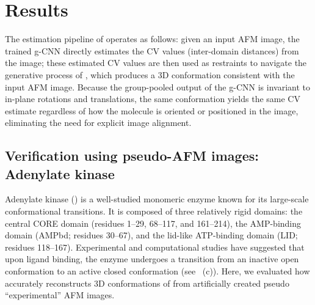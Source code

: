 \section{Results}
\label{sec:results}

The estimation pipeline of \Model operates as follows: given an input AFM image, the trained g-CNN directly estimates the CV values (inter-domain distances) from the image; these estimated CV values are then used as restraints to navigate the generative process of \AFiii, which produces a 3D conformation consistent with the input AFM image.
Because the group-pooled output of the g-CNN is invariant to in-plane rotations and translations, the same conformation yields the same CV estimate regardless of how the molecule is oriented or positioned in the image, eliminating the need for explicit image alignment.

\subsection{Verification using pseudo-AFM images: Adenylate kinase}
\label{subsec:ak_results}

Adenylate kinase (\AK) is a well-studied monomeric enzyme known for its large-scale conformational transitions. It is composed of three relatively rigid domains: the central CORE domain (residues 1–29, 68–117, and 161–214), the AMP-binding domain (AMPbd; residues 30–67), and the lid-like ATP-binding domain (LID; residues 118–167). Experimental and computational studies have suggested that upon ligand binding, the enzyme undergoes a transition from an inactive open conformation to an active closed conformation (see ~(c)). Here, we evaluated how accurately \Model reconstructs 3D conformations of \AK from artificially created pseudo ``experimental'' AFM images. 

